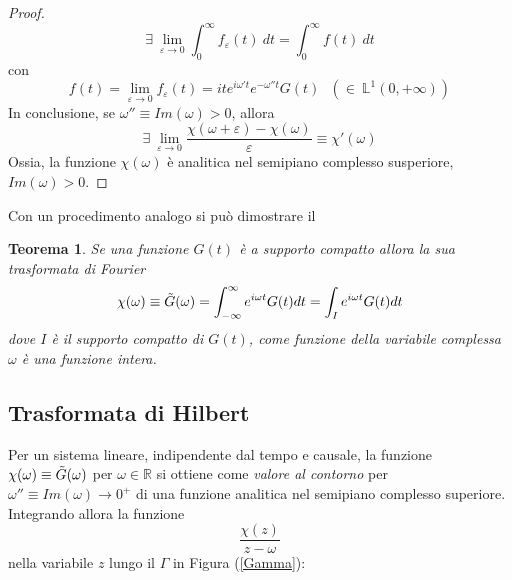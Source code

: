 \documentclass[twoside]{article}
\newtheorem{theorem}{Teorema}[section]
\begin{document}
\begin{proof}
\begin{equation}
    \exists \ \lim_{\varepsilon\to 0}\int_0^\infty f_\varepsilon(t)\ dt =\int_0^\infty f(t) \ dt
\end{equation}
con 
\begin{equation}
    f(t)=\lim_{\varepsilon\to 0}f_\varepsilon(t)=ite^{i\omega't}e^{-\omega'' t}G(t) \ \ \ (\in \ \mathds{L}^1(0,+\infty))
\end{equation}
In conclusione, se $\omega''\equiv Im(\omega)>0$, allora
\begin{equation*}
    \exists \ \lim_{\varepsilon\to 0}\frac{\chi(\omega+\varepsilon)-\chi (\omega)}{\varepsilon}\equiv \chi'(\omega)
\end{equation*}
Ossia, la funzione $\chi(\omega)$ è analitica nel semipiano complesso susperiore, $Im(\omega)>0$.

\end{proof}


Con un procedimento analogo si può dimostrare il 
\begin{theorem}
Se una funzione $G(t)$ è \textit{a supporto compatto} allora la sua trasformata di Fourier
\begin{equation}
    \chi(\omega)\equiv \Tilde{G}(\omega)=\int_{-\infty}^{\infty} e^{i\omega t}G(t) dt =\int_I e^{i\omega t}G(t)dt
\end{equation}
dove $I$ è il supporto compatto di $G(t)$, come funzione della variabile complessa $\omega$ è una funzione intera.
\end{theorem}

\subsection{Trasformata di Hilbert}
Per un sistema lineare, indipendente dal tempo e causale, la funzione $\chi(\omega)\equiv \Tilde{G}(\omega)$ per $\omega \in \mathds{R}$ si ottiene come \textit{valore al contorno} per $\omega''\equiv Im(\omega)\to 0^+$ di una funzione analitica nel semipiano complesso superiore.
\\
Integrando allora la funzione
\begin{equation}
    \frac{\chi(z)}{z-\omega}
\end{equation}
nella variabile $z$ lungo il $\Gamma$ in Figura (\ref{Gamma}):
\end{document}
